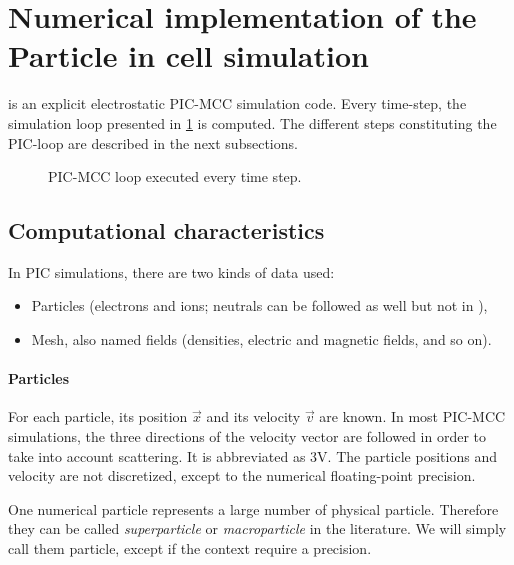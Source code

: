 \section{Numerical implementation of the Particle in cell simulation}

  \LPPic is an explicit electrostatic \ac{PIC}-\ac{MCC} simulation code.
  Every time-step, the simulation loop presented in \cref{fig-picloop} is computed.
  The different steps constituting the PIC-loop are described in the next subsections.
  \begin{figure}[hbtp]
    \centering
    \caption{\ac{PIC}-\ac{MCC} loop executed every time step.}
    \label{fig-picloop}
  \end{figure}


  \subsection{Computational characteristics}
    In \ac{PIC} simulations, there are two kinds of data used\string:
    \begin{itemize}
      \item Particles (electrons and ions; neutrals can be followed as well but not in \LPPic),
      \item Mesh, also named fields (densities, electric and magnetic fields, and so on).
    \end{itemize}


    \paragraph{Particles\\}
    For each particle, its position $\vec{x}$ and its velocity $\vec{v}$ are known.
    In most \ac{PIC}-\ac{MCC} simulations, the three directions of the velocity vector are followed in order to take into account scattering.
    It is abbreviated as \acs{3V}.
    The particle positions and velocity are not discretized, except to the numerical floating-point precision.

    One numerical particle represents a large number of physical particle. 
    Therefore they can be called \emph{superparticle} or \emph{macroparticle} in the literature.
    We will simply call them particle, except if the context require a precision.
    
